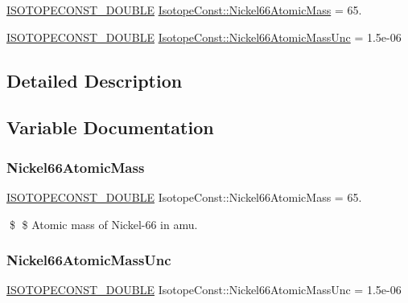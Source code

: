\begin{DoxyCompactItemize}
\item 
\mbox{\hyperlink{group___isotope_const-_macros_ga8f45a7272ce02c0b4c65c44636ed719a}{I\+S\+O\+T\+O\+P\+E\+C\+O\+N\+S\+T\+\_\+\+D\+O\+U\+B\+LE}} \mbox{\hyperlink{group___isotope_const-_nickel-_ni66_ga66f806b585f23e84283bfbfb55120d42}{Isotope\+Const\+::\+Nickel66\+Atomic\+Mass}} = 65.
\item 
\mbox{\hyperlink{group___isotope_const-_macros_ga8f45a7272ce02c0b4c65c44636ed719a}{I\+S\+O\+T\+O\+P\+E\+C\+O\+N\+S\+T\+\_\+\+D\+O\+U\+B\+LE}} \mbox{\hyperlink{group___isotope_const-_nickel-_ni66_gac484458226bf84c3dcc7c69b02e1c802}{Isotope\+Const\+::\+Nickel66\+Atomic\+Mass\+Unc}} = 1.\+5e-\/06
\end{DoxyCompactItemize}


\subsection{Detailed Description}


\subsection{Variable Documentation}
\mbox{\label{group___isotope_const-_nickel-_ni66_ga66f806b585f23e84283bfbfb55120d42}} 
\subsubsection{\texorpdfstring{Nickel66\+Atomic\+Mass}{Nickel66AtomicMass}}
{\footnotesize\ttfamily \mbox{\hyperlink{group___isotope_const-_macros_ga8f45a7272ce02c0b4c65c44636ed719a}{I\+S\+O\+T\+O\+P\+E\+C\+O\+N\+S\+T\+\_\+\+D\+O\+U\+B\+LE}} Isotope\+Const\+::\+Nickel66\+Atomic\+Mass = 65.}

\$ \$ Atomic mass of Nickel-\/66 in amu. \mbox{\label{group___isotope_const-_nickel-_ni66_gac484458226bf84c3dcc7c69b02e1c802}} 
\subsubsection{\texorpdfstring{Nickel66\+Atomic\+Mass\+Unc}{Nickel66AtomicMassUnc}}
{\footnotesize\ttfamily \mbox{\hyperlink{group___isotope_const-_macros_ga8f45a7272ce02c0b4c65c44636ed719a}{I\+S\+O\+T\+O\+P\+E\+C\+O\+N\+S\+T\+\_\+\+D\+O\+U\+B\+LE}} Isotope\+Const\+::\+Nickel66\+Atomic\+Mass\+Unc = 1.\+5e-\/06}

